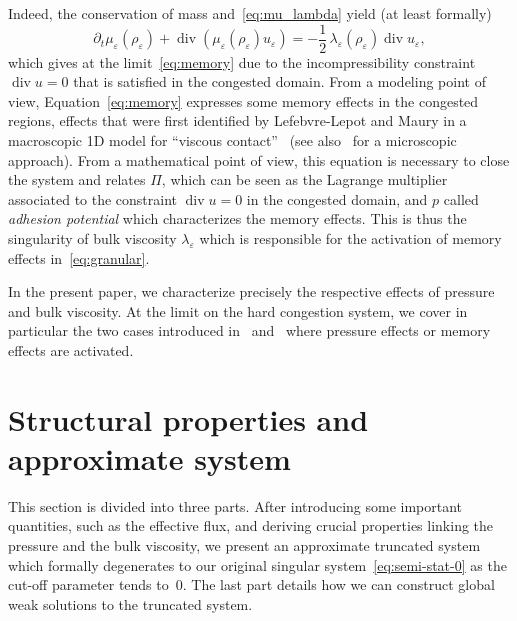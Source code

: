 \documentclass[10pt]{amsart}
\newcommand{\<}{\bigl\langle}
\renewcommand{\>}{\bigr\rangle}
\theoremstyle{definition}
\theoremstyle{remark}
\DeclareMathOperator{\Div}{div}
\let\ep\varepsilon
\begin{document}
Indeed, the conservation of mass and~\eqref{eq:mu_lambda} yield (at least formally)
\[
\partial_t \mu_\ep(\rho_\ep) + \Div(\mu_\ep(\rho_\ep) u_\ep) = - \dfrac{1}{2}\,\lambda_\ep(\rho_\ep)\Div u_\ep,
\]
which gives at the limit~\eqref{eq:memory} due to the incompressibility constraint $\Div u = 0$ that is satisfied in the congested domain.
From a modeling point of view, Equation~\eqref{eq:memory} expresses some memory effects in the congested regions, effects that were first identified by {Lefebvre-Lepot} and {Maury} in a macroscopic 1D model for ``viscous contact''~\cite{lefebvre2011} (see also~\cite{lefebvre2009} for a microscopic approach).
From a mathematical point of view, this equation is necessary to close the system and relates $\Pi$, which can be seen as the Lagrange multiplier associated to the constraint $\Div u = 0$ in the congested domain, and $p$ called \emph{adhesion potential} which characterizes the memory effects.
This is thus the singularity of bulk viscosity $\lambda_\ep$ which is responsible for the activation of memory effects in~\eqref{eq:granular}.

In the present paper, we characterize precisely the respective effects of pressure and bulk viscosity.
At the limit on the hard congestion system, we cover in particular the two cases introduced in~\cite{peza2015} and~\cite{perrin2017} where pressure effects or memory effects are activated.

\section{Structural properties and approximate system}

This section is divided into three parts.
After introducing some important quantities, such as the effective flux, and deriving crucial properties linking the pressure and the bulk viscosity, we present an approximate truncated system which formally degenerates to our original singular system~\eqref{eq:semi-stat-0} as the cut-off parameter tends to~$0$.
The last part details how we can construct global weak solutions to the truncated system.
\end{document}
